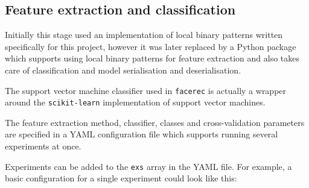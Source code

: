 \subsection{Feature extraction and classification}
Initially this stage used an implementation of local binary patterns written
specifically for this project, however it was later replaced by a Python
package \citep{facerec} which supports using local binary patterns for feature
extraction and also takes care of classification and model serialisation and
deserialisation.

The support vector machine classifier used in \texttt{facerec} is actually a
wrapper around the \texttt{scikit-learn} implementation of support vector
machines.

The feature extraction method, classifier, classes and cross-validation
parameters are specified in a YAML configuration file which supports running
several experiments at once. 

Experiments can be added to the \texttt{exs} array in the YAML file. For
example, a basic configuration for a single experiment could look like this:
\inputminted{yaml}{code/da_simple.yaml}

